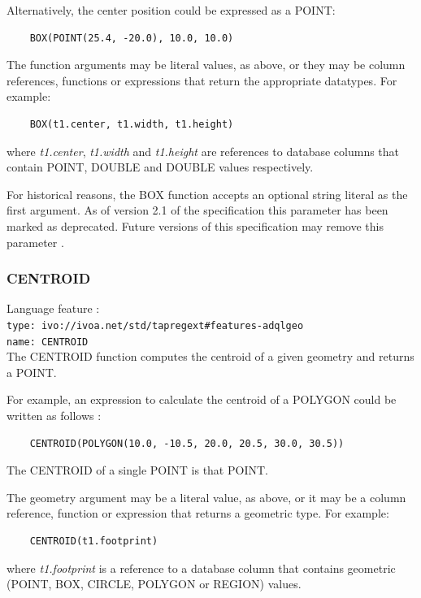 \documentclass[11pt,a4paper]{ivoa}
\begin{document}
Alternatively, the center position could be expressed as a POINT:
\begin{verbatim}
    BOX(POINT(25.4, -20.0), 10.0, 10.0)
\end{verbatim}

The function arguments may be literal values, as above, or they may be
column references, functions or expressions that return the appropriate
datatypes.
For example:
\begin{verbatim}
    BOX(t1.center, t1.width, t1.height)
\end{verbatim}
where \textit{t1.center}, \textit{t1.width} and \textit{t1.height}
are references to database columns that contain POINT, DOUBLE
and DOUBLE values respectively.

For historical reasons, the BOX function accepts an optional string literal as
the first argument.
As of version 2.1 of the specification this parameter has been
marked as deprecated.
Future versions of this specification may remove this parameter
.

\subsubsection{CENTROID}
\label{sec:functions.geom.centroid}
{\footnotesize Language feature :}\\
{\footnotesize \verb|type: ivo://ivoa.net/std/tapregext#features-adqlgeo|}\\
{\footnotesize \verb|name: CENTROID|}\\

The CENTROID function computes the centroid of a given geometry and returns a POINT.

For example, an expression to calculate the centroid of a POLYGON could
be written as follows :
\begin{verbatim}
    CENTROID(POLYGON(10.0, -10.5, 20.0, 20.5, 30.0, 30.5))
\end{verbatim}

The CENTROID of a single POINT is that POINT.

The geometry argument may be a literal value, as above, or it may be a
column reference, function or expression that returns a geometric type.
For example:
\begin{verbatim}
    CENTROID(t1.footprint)
\end{verbatim}
where \textit{t1.footprint} is a reference to a database column that
contains geometric (POINT, BOX, CIRCLE, POLYGON or REGION) values.
\end{document}
